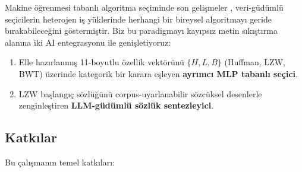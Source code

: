 \documentclass[conference]{IEEEtran}
\begin{document}
Makine öğrenmesi tabanlı algoritma seçiminde son gelişmeler \cite{kotthoff2014}, veri-güdümlü seçicilerin heterojen iş yüklerinde herhangi bir bireysel algoritmayı geride bırakabileceğini göstermiştir. Biz bu paradigmayı kayıpsız metin sıkıştırma alanına iki AI entegrasyonu ile genişletiyoruz:

\begin{enumerate}
\item Elle hazırlanmış 11-boyutlu özellik vektörünü \(\{H, L, B\}\) (Huffman, LZW, BWT) üzerinde kategorik bir karara eşleyen \textbf{ayrımcı MLP tabanlı seçici}.
\item LZW başlangıç sözlüğünü corpus-uyarlanabilir sözcüksel desenlerle zenginleştiren \textbf{LLM-güdümlü sözlük sentezleyici}.
\end{enumerate}

\subsection{Katkılar}

Bu çalışmanın temel katkıları:
\end{document}
